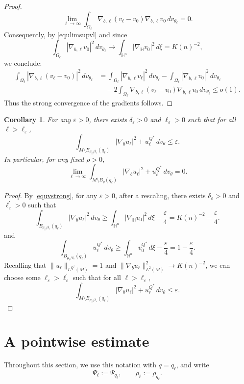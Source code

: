 \documentclass[11pt]{article}
\numberwithin{equation}{section}
\newtheorem{corollary}{Corollary}[section]
\numberwithin{equation}{section}
\begin{document}
\begin{proof}
		\[
		\lim_{\ell\to\infty} \int_{\Omega_\ell} \nabla_{b,\ell}(v_\ell-v_0)\nabla_{b,\ell}v_0 \,dv_{\theta_\ell} =0.
		\]
		Consequently, by \eqref{equlimsupvl} and since
		\[
		\int_{\Omega_\ell} |\nabla_{b,\ell}v_0|^2\,dv_{\theta_\ell} \to \int_{\mathbb H^n} |\nabla_{\mathbb H}v_0|^2\,d\xi = K(n)^{-2},
		\]
		we conclude:
		\[
		\begin{aligned}
			\int_{\Omega_\ell} |\nabla_{b,\ell}(v_\ell-v_0)|^2\,dv_{\theta_\ell} &= \int_{\Omega_\ell} |\nabla_{b,\ell}v_\ell|^2\,dv_{\theta_\ell} - \int_{\Omega_\ell} |\nabla_{b,\ell}v_0|^2\,dv_{\theta_\ell} \\
			&\quad -2 \int_{\Omega_\ell} \nabla_{b,\ell}(v_\ell-v_0)\nabla_{b,\ell}v_0 \,dv_{\theta_\ell} \le o(1).
		\end{aligned}
		\]
		Thus the strong convergence of the gradients follows.
	\end{proof}
	
	\begin{corollary}\label{coronepoint}
		For any \(\varepsilon>0\), there exists \(\delta_\varepsilon>0\) and \(\ell_\varepsilon>0\) such that for all \(\ell>\ell_\varepsilon\),
		\[
		\int_{M\setminus B_{\mu_\ell/\delta_\varepsilon}(q_\ell)} | \nabla_b u_\ell|^2 + u_\ell^{Q^*} \,dv_\theta \le \varepsilon.
		\]
		In particular, for any fixed \(\rho>0\),
		\[
		\lim_{\ell\to\infty} \int_{M\setminus B_{\rho}(q_\ell)} | \nabla_b u_\ell|^2 + u_\ell^{Q^*} \,dv_\theta = 0.
		\]
	\end{corollary}
	\begin{proof}
		By \eqref{equvstrong}, for any \(\varepsilon>0\), after a rescaling, there exists \(\delta_\varepsilon>0\)  and \(\ell_\varepsilon^\prime>0\) such that
		\[
		\int_{B_{\mu_\ell/\delta_\varepsilon}(q_\ell)}|\nabla_b u_\ell|^2  \,dv_\theta \ge \int_{\mathbb H^n}|\nabla_{\mathbb H}v_0|^2\,d\xi - \frac{\varepsilon}{4} = K(n)^{-2} - \frac{\varepsilon}{4}.
		\]
		and
		\[
		\int_{B_{\mu_\ell/\delta_\varepsilon}(q_\ell)} u_\ell^{Q^*} \,dv_\theta \ge \int_{\mathbb H^n} v_0^{Q^*} \,d\xi - \frac{\varepsilon}{4}= 1 - \frac{\varepsilon}{4}.
		\]
		Recalling that \(\|u_\ell\|_{L^{Q^*}(M)}=1\) and \(\|\nabla_b u_\ell\|_{L^2(M)}^2 \to K(n)^{-2}\), we can choose some \(\ell_\varepsilon>\ell_\varepsilon^\prime\) such that for all \(\ell>\ell_\varepsilon\),
		\[
		\int_{M\setminus B_{\mu_\ell/\delta_\varepsilon}(q_\ell)} | \nabla_b u_\ell|^2 + u_\ell^{Q^*} \,dv_\theta \le \varepsilon.
		\]
	\end{proof}
	
	\section{A pointwise estimate}\label{sectionpointwise}
	Throughout this section, we use this notation with \(q=q_\ell\), and write
	\[
	\Psi_\ell:=\Psi_{q_\ell},\qquad \rho_\ell:=\rho_{q_\ell}.
	\]
	
\end{document}
